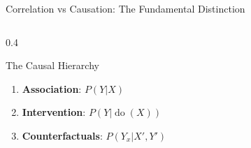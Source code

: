 \documentclass[aspectratio=169,11pt]{beamer}
\DeclareMathOperator{\doo}{do}
\begin{document}
\begin{frame}{Correlation vs Causation: The Fundamental Distinction}
\begin{columns}
\begin{column}{0.4\textwidth}
\begin{figure}
\end{figure}
\begin{alertblock}{The Causal Hierarchy}
\begin{enumerate}
\item \textbf{Association}: $P(Y|X)$
\item \textbf{Intervention}: $P(Y|\doo(X))$
\item \textbf{Counterfactuals}: $P(Y_x|X',Y')$
\end{enumerate}
\end{alertblock}
\end{column}
\end{columns}
\end{frame}
\end{document}
